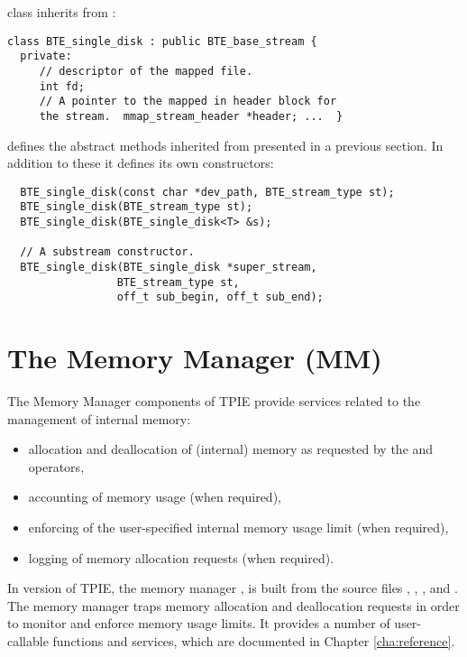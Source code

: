  class inherits from :
\begin{verbatim}
class BTE_single_disk : public BTE_base_stream { 
  private:
     // descriptor of the mapped file.  
     int fd;
     // A pointer to the mapped in header block for
     the stream.  mmap_stream_header *header; ...  }
\end{verbatim}

 defines the abstract methods inherited from
 presented in a previous section. In addition to
these it defines its own constructors:
\begin{verbatim}
  BTE_single_disk(const char *dev_path, BTE_stream_type st); 
  BTE_single_disk(BTE_stream_type st); 
  BTE_single_disk(BTE_single_disk<T> &s); 
  
  // A substream constructor.
  BTE_single_disk(BTE_single_disk *super_stream,
                 BTE_stream_type st,
                 off_t sub_begin, off_t sub_end);
\end{verbatim}


\section{The Memory Manager (MM)}
\label{sec:ref-mm}

The Memory Manager components of TPIE provide services related to
the management of internal memory:
\begin{itemize}
\item allocation and deallocation of (internal)
memory as requested by the  and  operators,
\item accounting of memory usage (when required),
\item enforcing of the user-specified internal memory usage
limit (when required),
\item logging of memory allocation requests (when required).
\end{itemize}

In version \version of TPIE, the memory manager
, is built from the source files
, ,
, and .  The memory
manager traps memory allocation and deallocation requests in
order to monitor and enforce memory usage limits. It
provides a number of user-callable functions and services,
which are documented in Chapter \ref{cha:reference}.

